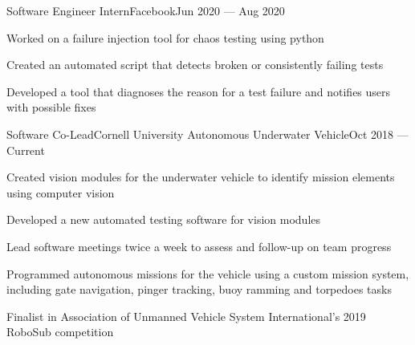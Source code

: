 \documentclass{resume}
\begin{document}
\begin{experience}
    \begin{entry}{Software Engineer Intern}{Facebook}{Jun 2020 --- Aug 2020}
        \begin{description}
            \item Worked on a failure injection tool for chaos testing using
                python
            \item Created an automated script that detects broken or consistently
                failing tests
            \item Developed a tool that diagnoses the reason for a test failure
                and notifies users with possible fixes
        \end{description}
    \end{entry}

    \begin{entry}{Software Co-Lead}{Cornell University Autonomous Underwater
        Vehicle}{Oct 2018 --- Current}
        \begin{description}
            \item Created vision modules for the underwater vehicle to identify
                mission elements using computer vision
            \item Developed a new automated testing software for vision modules
            \item Lead software meetings twice a week to assess and follow-up on
                team progress
            \item Programmed autonomous missions for the vehicle using a custom
                mission system, including gate navigation, pinger tracking, buoy
                ramming and torpedoes tasks
            \item Finalist in Association of Unmanned Vehicle System
                International's 2019 RoboSub competition
        \end{description}
    \end{entry}



\end{experience}
\end{document}
